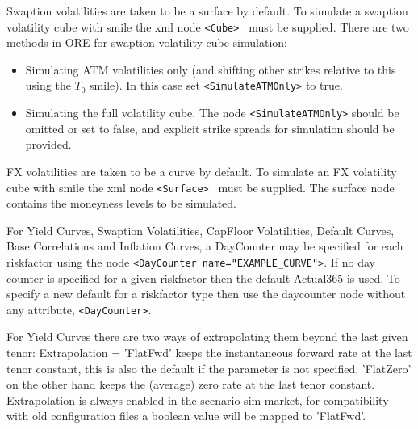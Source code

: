 \documentclass[12pt, a4paper]{article}
\begin{document}
{{Swaption volatilities are taken to be a surface by default. To simulate a swaption volatility cube with smile the xml node {\tt <Cube> } must be supplied.
There are two methods in ORE for swaption volatility cube simulation: 
\begin{itemize}
\item Simulating ATM volatilities only (and shifting other strikes relative to this using the $T_{0}$ smile). In this case set {\tt <SimulateATMOnly>} to true.
\item Simulating the full volatility cube. The node {\tt <SimulateATMOnly>} should be omitted or set to false, and explicit strike spreads for simulation should be provided.
\end{itemize}

FX volatilities are taken to be a curve by default. To simulate an FX volatility cube with smile the xml node {\tt <Surface> } must be supplied. The surface node contains the moneyness levels to be simulated.

For Yield Curves, Swaption Volatilities, CapFloor Volatilities, Default Curves, Base Correlations and Inflation Curves, a DayCounter may be specified for each riskfactor using the node {\tt <DayCounter name="EXAMPLE\_CURVE">}.  
If no day counter is specified for a given riskfactor then the default Actual365 is used. To specify a new default for a riskfactor type then use the daycounter node without any attribute,  {\tt <DayCounter>}. 

For Yield Curves there are two ways of extrapolating them beyond the last given tenor: Extrapolation = 'FlatFwd' keeps
the instantaneous forward rate at the last tenor constant, this is also the default if the parameter is not specified.
'FlatZero' on the other hand keeps the (average) zero rate at the last tenor constant. Extrapolation is always enabled
in the scenario sim market, for compatibility with old configuration files a boolean value will be mapped to 'FlatFwd'.

}}
\end{document}
